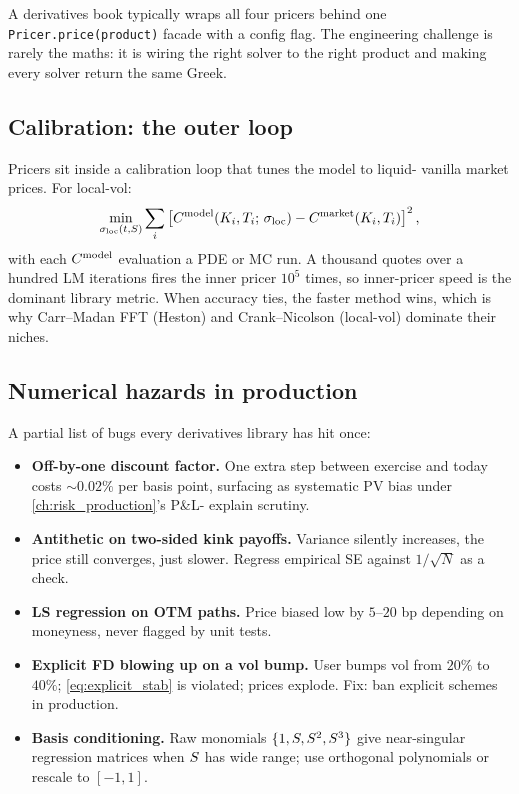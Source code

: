 A derivatives book typically wraps all four pricers behind one
\verb|Pricer.price(product)| facade with a config flag.  The
engineering challenge is rarely the maths: it is wiring the right
solver to the right product and making every solver return the same
Greek.

\subsection{Calibration: the outer loop}

Pricers sit inside a calibration loop that tunes the model to liquid-
vanilla market prices.  For local-vol:
\begin{equation}
  \min_{\sigma_{\text{loc}}(t, S)}
  \sum_i \left[ C^{\mathrm{model}}(K_i, T_i;\, \sigma_{\text{loc}})
                - C^{\mathrm{market}}(K_i, T_i) \right]^2,
\end{equation}
with each $C^{\mathrm{model}}$ evaluation a PDE or MC run.  A
thousand quotes over a hundred LM iterations fires the inner pricer
$10^5$ times, so inner-pricer speed is the dominant library metric.
When accuracy ties, the faster method wins, which is why Carr--Madan FFT
(Heston) and Crank--Nicolson (local-vol) dominate their niches.

\subsection{Numerical hazards in production}

A partial list of bugs every derivatives library has hit once:
\begin{itemize}
  \item \textbf{Off-by-one discount factor.}  One extra step between
    exercise and today costs $\sim 0.02\%$ per basis point, surfacing
    as systematic PV bias under \cref{ch:risk_production}'s P\&L-
    explain scrutiny.
  \item \textbf{Antithetic on two-sided kink payoffs.}  Variance
    silently increases, the price still converges, just slower.
    Regress empirical SE against $1/\sqrt N$ as a check.
  \item \textbf{LS regression on OTM paths.}  Price biased low by
    $5$--$20$ bp depending on moneyness, never flagged by unit tests.
  \item \textbf{Explicit FD blowing up on a vol bump.}  User bumps
    vol from $20\%$ to $40\%$; \eqref{eq:explicit_stab} is violated;
    prices explode.  Fix: ban explicit schemes in production.
  \item \textbf{Basis conditioning.}  Raw monomials $\{1, S,
    S^2, S^3\}$ give near-singular regression matrices when
    $S$ has wide range; use orthogonal polynomials or rescale to
    $[-1, 1]$.
\end{itemize}


